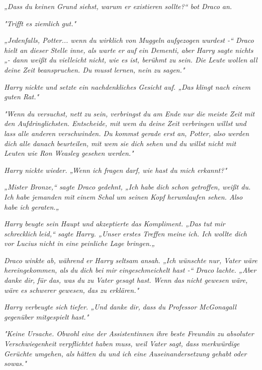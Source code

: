 {\emph{„Dass du keinen Grund siehst, warum er existieren sollte?“ bot Draco an.}

\emph{"Trifft es ziemlich gut."}

\emph{„Jedenfalls, Potter... wenn du wirklich von Muggeln aufgezogen wurdest -“ Draco hielt an dieser Stelle inne, als warte er auf ein Dementi, aber Harry sagte nichts „- dann weißt du vielleicht nicht, wie es ist, berühmt zu sein. Die Leute wollen} \emph{\emph{all}} \emph{deine Zeit beanspruchen. Du} \emph{\emph{musst}} \emph{lernen, nein zu sagen."}

\emph{Harry nickte und setzte ein nachdenkliches Gesicht auf. „Das klingt nach einem guten Rat."}

\emph{"Wenn du versuchst, nett zu sein, verbringst du am Ende nur die meiste Zeit mit den Aufdringlichsten. Entscheide, mit wem du deine Zeit verbringen} \emph{\emph{willst}} \emph{und lass alle anderen verschwinden. Du kommst gerade erst an, Potter, also werden dich alle danach beurteilen, mit wem sie dich sehen und du willst nicht mit Leuten wie Ron Weasley gesehen werden."}

\emph{Harry nickte wieder. „Wenn ich fragen darf, wie hast du mich erkannt?"}

\emph{„\emph{Mister Bronze,}“ sagte Draco gedehnt, „Ich} \emph{\emph{habe}} \emph{dich schon getroffen, weißt du. Ich habe jemanden mit einem Schal um seinen Kopf herumlaufen sehen. Also habe ich} \emph{\emph{geraten.}„}

\emph{Harry beugte sein Haupt und akzeptierte das Kompliment. „Das tut mir} \emph{\emph{schrecklich}} \emph{leid,“ sagte Harry. „Unser erstes Treffen meine ich. Ich wollte dich vor Lucius nicht in eine peinliche Lage bringen.„}

\emph{Draco winkte ab, während er Harry seltsam ansah. „Ich wünschte nur, Vater wäre hereingekommen, als} \emph{\emph{du}} \emph{dich bei} \emph{\emph{mir}} \emph{eingeschmeichelt hast -“ Draco lachte. „Aber danke} \emph{\emph{dir,}} \emph{für das, was du zu Vater gesagt hast. Wenn das nicht gewesen wäre, wäre es schwerer gewesen, das zu erklären."}

\emph{Harry verbeugte sich tiefer. „Und danke} \emph{\emph{dir,}} \emph{dass du Professor McGonagall gegenüber mitgespielt hast."}

\emph{"Keine Ursache. Obwohl eine der Assistentinnen ihre beste Freundin zu absoluter Verschwiegenheit verpflichtet haben muss, weil Vater sagt, dass merkwürdige Gerüchte umgehen, als hätten du und ich eine Auseinandersetzung gehabt oder sowas."}

}
